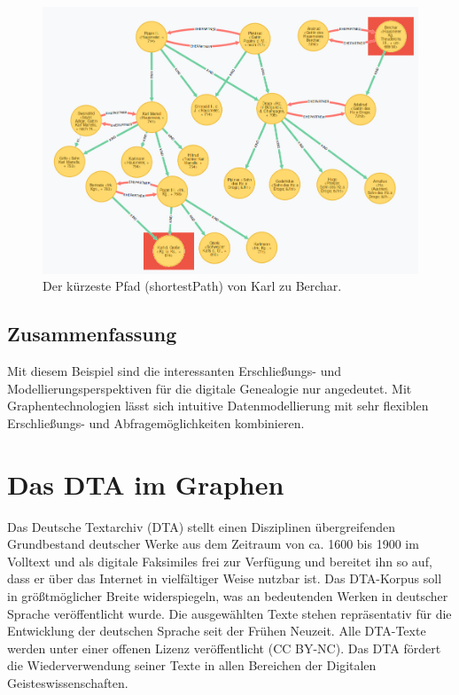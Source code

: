 \documentclass[ngerman,]{scrreprt}
\begin{document}
\begin{figure}
\centering
\includegraphics{Bilder/NeG/050-Berchar-Karl-shortestpath.jpg}
\caption{Der kürzeste Pfad (shortestPath) von Karl zu Berchar.}
\end{figure}

\section{Zusammenfassung}\label{zusammenfassung-2}

Mit diesem Beispiel sind die interessanten Erschließungs- und Modellierungsperspektiven für die digitale Genealogie nur angedeutet. Mit Graphentechnologien lässt sich intuitive Datenmodellierung mit sehr flexiblen Erschließungs- und Abfragemöglichkeiten kombinieren.

\chapter{Das DTA im Graphen}\label{das-dta-im-graphen}

Das Deutsche Textarchiv (DTA) stellt einen Disziplinen übergreifenden Grundbestand deutscher Werke aus dem Zeitraum von ca. 1600 bis 1900 im Volltext und als digitale Faksimiles frei zur Verfügung und bereitet ihn so auf, dass er über das Internet in vielfältiger Weise nutzbar ist. Das DTA-Korpus soll in größtmöglicher Breite widerspiegeln, was an bedeutenden Werken in deutscher Sprache veröffentlicht wurde. Die ausgewählten Texte stehen repräsentativ für die Entwicklung der deutschen Sprache seit der Frühen Neuzeit. Alle DTA-Texte werden unter einer offenen Lizenz veröffentlicht (CC BY-NC). Das DTA fördert die Wiederverwendung seiner Texte in allen Bereichen der Digitalen Geisteswissenschaften.
\end{document}
